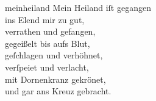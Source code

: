 \documentclass[tocstyle=ref-genre]{ees}
\begin{document}
{  \begin{movement}{meinheiland}
    \voice[Coro]
    Mein Heiland iſt gegangen\\
    ins Elend mir zu gut,\\
    verrathen und gefangen,\\
    gegeißelt bis aufs Blut,\\
    geſchlagen und verhöhnet,\\
    verſpeiet und verlacht,\\
    mit Dornenkranz gekrönet,\\
    und gar ans Kreuz gebracht.
  \end{movement}

  \begin{movement}{}
    \voice[]
  \end{movement}

  \begin{movement}{}
    \voice[]
  \end{movement}

  \begin{movement}{}
    \voice[]
  \end{movement}

  \begin{movement}{}
    \voice[]
  \end{movement}

  \begin{movement}{}
    \voice[]
  \end{movement}

  \begin{movement}{}
    \voice[]
  \end{movement}

  \begin{movement}{}
    \voice[]
  \end{movement}

  \begin{movement}{}
    \voice[]
  \end{movement}
}

\eesScore
\end{document}
